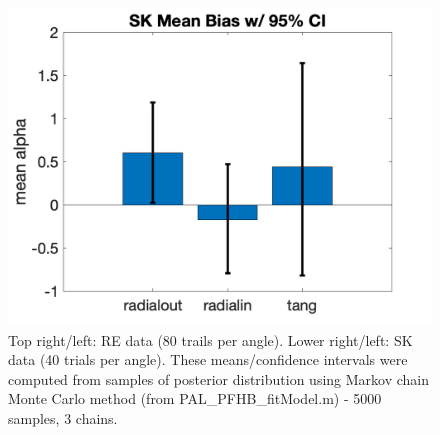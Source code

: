 \documentclass[11pt]{article} %
\begin{document}
\begin{figure}[H]
\includegraphics[scale=.2]{Images/MeanBiasError_95ci_SK.png}
\caption{Top right/left: RE data (80 trails per angle). Lower right/left: SK data (40 trials per angle). These means/confidence intervals were computed from samples of posterior distribution using Markov chain Monte Carlo method (from PAL\_PFHB\_fitModel.m) - 5000 samples, 3 chains.}
\end{figure}

\newpage
\end{document}
